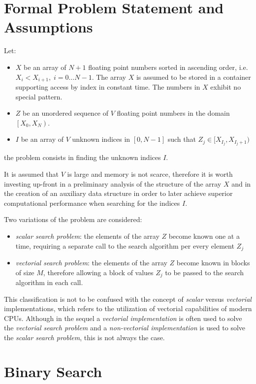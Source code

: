 \documentclass[preprint,1p,times]{elsarticle}
\begin{document}
\section{Formal Problem Statement and Assumptions}
\label{sec:definition}
\noindent Let: 
\begin{itemize}
	\item $X$ be an array of $N+1$ floating point numbers sorted in ascending order, i.e. $X_{i}<X_{i+1}, \; i=0 \dots N-1$.
	The array $X$ is assumed to be stored in a container supporting access by index in constant time. The numbers in $X$ exhibit no special pattern.
	\item $Z$ be an unordered sequence of $V$ floating point numbers in the domain $\left[X_0, X_N \right)$.
\item $I$ be an array of $V$ unknown indices in $[0,N-1]$ such that $Z_j \in [X_{I_j}, X_{I_j+1})$
\end{itemize}
the problem consists in finding the unknown indices $I$.

It is assumed that $V$ is large and memory is not scarce, therefore it is worth investing up-front in a preliminary analysis of the structure of the array $X$ and in the creation of an auxiliary data structure in order to later achieve superior computational performance when searching for the indices $I$.

Two variations of the problem are considered:
\begin{itemize}
\item \textit{scalar search problem}: the elements of the array $Z$ become known one at a time, requiring a separate call to the search algorithm per every element $Z_j$
\item \textit{vectorial search problem}: the elements of the array $Z$ become known in blocks of size $M$, therefore allowing a block of values $Z_j$ to be passed to the search algorithm in each call.
\end{itemize}
This classification is not to be confused with the concept of \textit{scalar} versus \textit{vectorial} implementations, which refers to the utilization of vectorial capabilities of modern CPUs. Although in the sequel a \textit{vectorial implementation} is often used to solve the \textit{vectorial search problem} and a \textit{non-vectorial implementation} is used to solve the \textit{scalar search problem}, this is not always the case.

\section{Binary Search}
\end{document}
